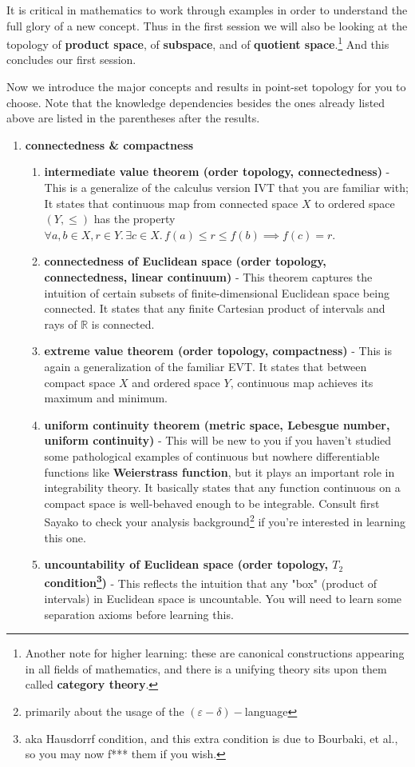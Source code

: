 \documentclass[10pt]{article}
\begin{document}
It is critical in mathematics to work through examples in order to understand the full glory of a new concept. Thus in the first session we will also be looking at the topology of \textbf{product space}, of \textbf{subspace}, and of \textbf{quotient space}.\footnote{Another note for higher learning: these are canonical constructions appearing in all fields of mathematics, and there is a unifying theory sits upon them called \textbf{category theory}.} And this concludes our first session.

Now we introduce the major concepts and results in point-set topology for you to choose. Note that the knowledge dependencies besides the ones already listed above are listed in the parentheses after the results.

\begin{enumerate}
\item \textbf{connectedness \& compactness} 
\begin{enumerate}[label=\alph*.]
\item \textbf{intermediate value theorem (order topology, connectedness)} - This is a generalize of the calculus version IVT that you are familiar with; It states that continuous map from connected space $X$ to ordered space $(Y,\leq)$ has the property $\forall a,b\in X, r\in Y.\,\exists c\in X.\,f(a)\leq r\leq f(b)\implies f(c)=r$.
\item \textbf{connectedness of Euclidean space (order topology, connectedness, linear continuum)} - This theorem captures the intuition of certain subsets of finite-dimensional Euclidean space being connected. It states that any finite Cartesian product of intervals and rays of $\mathbb{R}$ is connected.
\item \textbf{extreme value theorem (order topology, compactness)} - This is again a generalization of the familiar EVT. It states that between compact space $X$ and ordered space $Y$, continuous map achieves its maximum and minimum.
\item \textbf{uniform continuity theorem (metric space, Lebesgue number, uniform continuity)} - This will be new to you if you haven't studied some pathological examples of continuous but nowhere differentiable functions like \textbf{Weierstrass function}, but it plays an important role in integrability theory. It basically states that any function continuous on a compact space is well-behaved enough to be integrable. Consult first Sayako to check your analysis background\footnote{primarily about the usage of the $(\varepsilon-\delta)-$language} if you're interested in learning this one.
\item \textbf{uncountability of Euclidean space (order topology, $T_2$ condition\footnote{aka Hausdorrf condition, and this extra condition is due to Bourbaki, et al., so you may now f*** them if you wish.})} - This reflects the intuition that any "box" (product of intervals) in Euclidean space is uncountable. You will need to learn some separation axioms before learning this.
\end{enumerate}
\end{enumerate}
\end{document}
